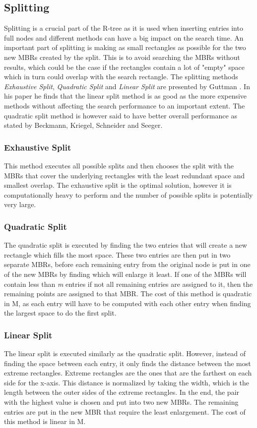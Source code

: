 \subsection{Splitting}
Splitting is a crucial part of the R-tree as it is used when inserting entries into full nodes and different methods can have a big impact on the search time. An important part of splitting is making as small rectangles as possible for the two new MBRs created by the split. This is to avoid searching the MBRs without results, which could be the case if the rectangles contain a lot of "empty" space which in turn could overlap with the search rectangle. The splitting methods \emph{Exhaustive Split}, \emph{Quadratic Split} and \emph{Linear Split} are presented by Guttman \cite{r-tree}. In his paper he finds that the linear split method is as good as the more expensive methods without affecting the search performance to an important extent. The quadratic split method is however said to have better overall performance as stated by Beckmann, Kriegel, Schneider and Seeger\cite{R*-tree}.

\subsubsection{Exhaustive Split}
This method executes all possible splits and then chooses the split with the MBRs that cover the underlying rectangles with the least redundant space and smallest overlap. The exhaustive split is the optimal solution, however it is computationally heavy to perform and the number of possible splits is potentially very large.

\subsubsection{Quadratic Split}
The quadratic split is executed by finding the two entries that will create a new rectangle which fills the most space. These two entries are then put in two separate MBRs, before each remaining entry from the original node is put in one of the new MBRs by finding which will enlarge it least. If one of the MBRs will contain less than \emph{m} entries if not all remaining entries are assigned to it, then the remaining points are assigned to that MBR. The cost of this method is quadratic in M, as each entry will have to be computed with each other entry when finding the largest space to do the first split. 

\subsubsection{Linear Split}
The linear split is executed similarly as the quadratic split. However, instead of finding the space between each entry, it only finds the distance between the most extreme rectangles. Extreme rectangles are the ones that are the farthest on each side for the x-axis. This distance is normalized by taking the width, which is the length between the outer sides of the extreme rectangles. In the end, the pair with the highest value is chosen and put into two new MBRs. The remaining entries are put in the new MBR that require the least enlargement. The cost of this method is linear in M. 


